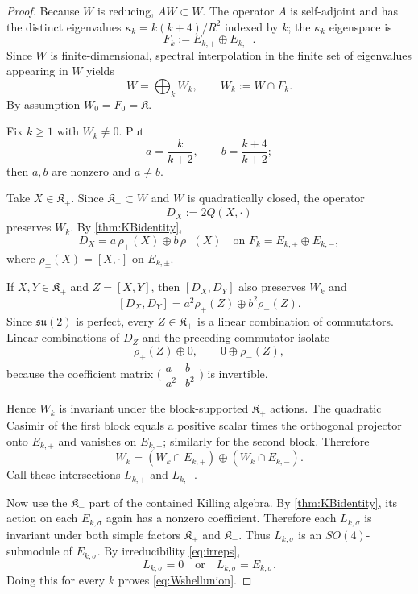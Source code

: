 \documentclass[
 aps,
 prd,
 reprint,
 amsmath,
 amssymb,
 nofootinbib,
 superscriptaddress
]{revtex4-2}
\theoremstyle{definition}
\theoremstyle{remark}
\newcommand{\cK}{\mathfrak K}
\newcommand{\cKp}{\mathfrak K_+}
\newcommand{\cKm}{\mathfrak K_-}
\begin{document}
\begin{proof}
Because $W$ is reducing, $AW\subset W$.  The operator $A$ is self-adjoint and
has the distinct eigenvalues
$\kappa_k=k(k+4)/R^2$ indexed by $k$; the $\kappa_k$ eigenspace is
\[
 F_k:=E_{k,+}\oplus E_{k,-}.
\]
Since $W$ is finite-dimensional, spectral interpolation in the finite set of
eigenvalues appearing in $W$ yields
\[
 W=\bigoplus_k W_k,\qquad W_k:=W\cap F_k.
\]
By assumption $W_0=F_0=\cK$.

Fix $k\ge1$ with $W_k\ne0$.  Put
\[
 a=\frac{k}{k+2},\qquad b=\frac{k+4}{k+2};
\]
then $a,b$ are nonzero and $a\ne b$.

Take $X\in\cKp$.  Since $\cKp\subset W$ and $W$ is quadratically closed,
the operator
\[
 D_X:=2Q(X,\cdot)
\]
preserves $W_k$.  By \cref{thm:KBidentity},
\begin{equation}
 D_X
 =
 a\,\rho_+(X)\oplus b\,\rho_-(X)
 \quad\text{on }F_k=E_{k,+}\oplus E_{k,-},
 \label{eq:DXblocks}
\end{equation}
where $\rho_\pm(X)=[X,\cdot]$ on $E_{k,\pm}$.

If $X,Y\in\cKp$ and $Z=[X,Y]$, then $[D_X,D_Y]$ also preserves $W_k$ and
\[
 [D_X,D_Y]
 =
 a^2\rho_+(Z)\oplus b^2\rho_-(Z).
\]
Since $\mathfrak{su}(2)$ is perfect, every $Z\in\cKp$ is a linear
combination of commutators.  Linear combinations of $D_Z$ and the preceding
commutator isolate
\[
 \rho_+(Z)\oplus0,
 \qquad
 0\oplus\rho_-(Z),
\]
because the coefficient matrix
$\bigl(\begin{smallmatrix}a&b\\a^2&b^2\end{smallmatrix}\bigr)$ is invertible.

Hence $W_k$ is invariant under the block-supported $\cKp$ actions.
The quadratic Casimir of the first block equals a positive scalar times the
orthogonal projector onto $E_{k,+}$ and vanishes on $E_{k,-}$; similarly for
the second block.  Therefore
\[
 W_k=(W_k\cap E_{k,+})\oplus(W_k\cap E_{k,-}).
\]
Call these intersections $L_{k,+}$ and $L_{k,-}$.

Now use the $\cKm$ part of the contained Killing algebra.  By
\cref{thm:KBidentity}, its action on each $E_{k,\sigma}$ again has a nonzero
coefficient.  Therefore each $L_{k,\sigma}$ is invariant under both simple
factors $\cKp$ and $\cKm$.  Thus $L_{k,\sigma}$ is an $SO(4)$-submodule of
$E_{k,\sigma}$.  By irreducibility \eqref{eq:irreps},
\[
 L_{k,\sigma}=0
 \quad\text{or}\quad
 L_{k,\sigma}=E_{k,\sigma}.
\]
Doing this for every $k$ proves \eqref{eq:Wshellunion}.
\end{proof}
\end{document}
